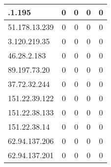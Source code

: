 \documentclass{article}
\begin{document}
\begin{longtable}{|>{\raggedright\arraybackslash}p{3cm}|c|c|c|c|}
    151.101.1.195 & 0 & 0 & 0 & 0 \\
    \hline
    
    
    \rowcolor{lightgreen} %
    
    51.178.13.239 & 0 & 0 & 0 & 0 \\
    \hline
    
    
    \rowcolor{lightgreen} %
    
    3.120.219.35 & 0 & 0 & 0 & 0 \\
    \hline
    
    
    \rowcolor{lightgreen} %
    
    46.28.2.183 & 0 & 0 & 0 & 0 \\
    \hline
    
    
    \rowcolor{lightgreen} %
    
    89.197.73.20 & 0 & 0 & 0 & 0 \\
    \hline
    
    
    \rowcolor{lightgreen} %
    
    37.72.32.244 & 0 & 0 & 0 & 0 \\
    \hline
    
    
    \rowcolor{lightgreen} %
    
    151.22.39.122 & 0 & 0 & 0 & 0 \\
    \hline
    
    
    \rowcolor{lightgreen} %
    
    151.22.38.133 & 0 & 0 & 0 & 0 \\
    \hline
    
    
    \rowcolor{lightgreen} %
    
    151.22.38.14 & 0 & 0 & 0 & 0 \\
    \hline
    
    
    \rowcolor{lightgreen} %
    
    62.94.137.206 & 0 & 0 & 0 & 0 \\
    \hline
    
    
    \rowcolor{lightgreen} %
    
    62.94.137.201 & 0 & 0 & 0 & 0 \\
    \hline
    

\end{longtable}
\end{document}
